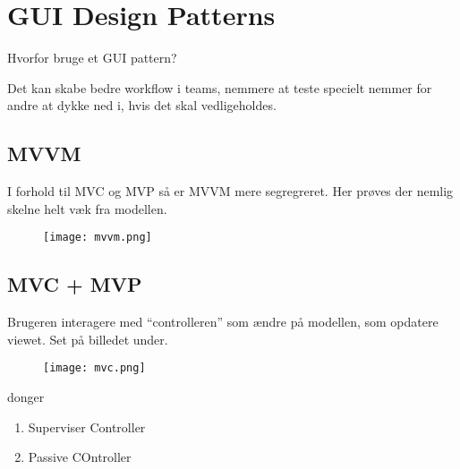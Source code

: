 \documentclass[../SWD_disp.tex]{subfiles}
\begin{document}
\section{GUI Design Patterns}
Hvorfor bruge et GUI pattern?

Det kan skabe bedre workflow i teams, nemmere at teste specielt nemmer for andre at dykke ned i, hvis det skal vedligeholdes.


\subsection{MVVM}
I forhold til MVC og MVP så er MVVM mere segregreret. Her prøves der nemlig skelne helt væk fra modellen.

\begin{figure}[H]
	\centering
	\texttt{[image: mvvm.png]}
\end{figure}
\subsection{MVC + MVP}
Brugeren interagere med ``controlleren'' som ændre på modellen, som opdatere viewet. Set på billedet under.
\begin{figure}[H]
	\centering
	\texttt{[image: mvc.png]}
\end{figure}
donger
\begin{enumerate}
	\item Superviser Controller
	\item Passive COntroller
\end{enumerate}
\end{document}
